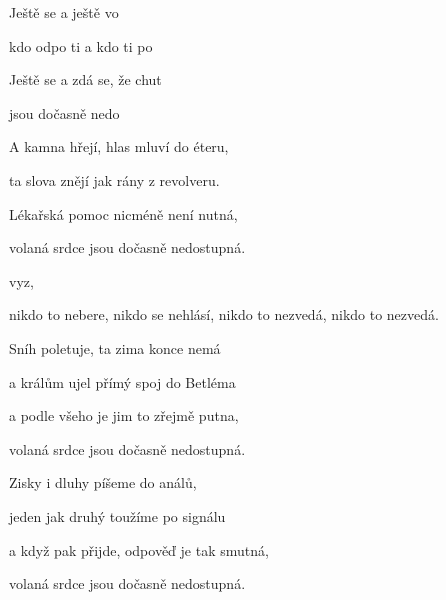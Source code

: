 


\zs
Ještě se  a ještě  vo

kdo odpo ti a kdo ti  po

Ještě se  a zdá se, že  chut

  jsou dočasně nedo
\ks

\zs
A kamna hřejí, hlas mluví do éteru,

ta slova znějí jak rány z revolveru.

Lékařská pomoc nicméně není nutná,

volaná srdce jsou dočasně nedostupná.
\ks

\zr
{}   vyz,       

nikdo to nebere,
nikdo se nehlásí,
nikdo to nezvedá,
nikdo to nezvedá.
\kr

\zs
Sníh poletuje, ta zima konce nemá

a králům ujel přímý spoj do Betléma

a podle všeho je jim to zřejmě putna,

volaná srdce jsou dočasně nedostupná.
\ks

\zr \kr

\zs
Zisky i dluhy píšeme do análů,

jeden jak druhý toužíme po signálu

a když pak přijde, odpověď je tak smutná,

volaná srdce jsou dočasně nedostupná.
\ks

\zr \kr


\kp








